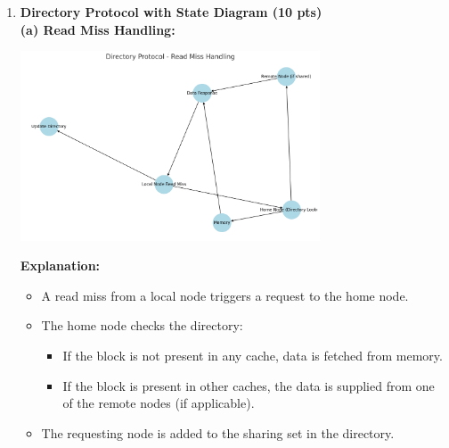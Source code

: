\documentclass[11pt]{article}
\begin{document}
\begin{enumerate}
    \item \textbf{Directory Protocol with State Diagram (10 pts)} \\
    \textbf{(a) Read Miss Handling:} \\
    \begin{center}
        \includegraphics[width=0.7\textwidth]{Directory Protocol - Read Miss Handling.png}
    \end{center}
    \textbf{Explanation:}
    \begin{itemize}
        \item A read miss from a local node triggers a request to the home node.
        \item The home node checks the directory:
        \begin{itemize}
            \item If the block is not present in any cache, data is fetched from memory.
            \item If the block is present in other caches, the data is supplied from one of the remote nodes (if applicable).
        \end{itemize}
        \item The requesting node is added to the sharing set in the directory.
    \end{itemize}


\end{enumerate}
\end{document}

